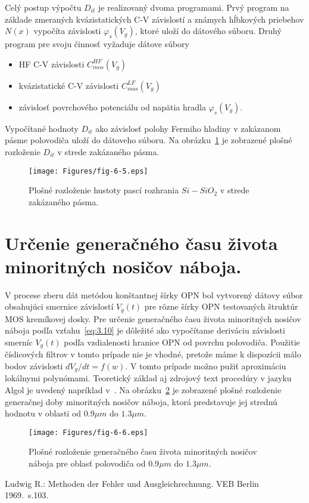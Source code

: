 Celý postup výpočtu $D_{it}$ je realizovaný dvoma programami. Prvý
program na základe zmeraných kvázistatických C-V závislostí a známych
hĺbkových priebehov $N(x)$ vypočíta závislosti $\varphi_{s}(V_{g})$,
ktoré uloží do dátového súboru. Druhý program pre svoju činnosť
vyžaduje dátove súbory

\begin{itemize}
\item HF C-V závislosti $C_{mos}^{HF}(V_{g})$
\item kvázistatické C-V závislosti $C_{mos}^{LF}(V_{g})$
\item závislosť povrchového potenciálu od napätia hradla $\varphi_{s}(V_{g})$.
\end{itemize}

Vypočítané hodnoty $D_{it}$ ako závislosť polohy Fermiho hladiny v
zakázanom pásme polovodiča uloží do dátoveho súboru. Na
obrázku~\ref{fig:6.5} je zobrazené plošné rozloženie $D_{it}$ v strede
zakázaného pásma.

\begin{figure}[h!]\centering
  \texttt{[image: Figures/fig-6-5.eps]}
  \caption[Plošné rozloženie hustoty pascí rozhrania $Si-SiO_{2}$ v
    strede zakázaného pásma]{Plošné rozloženie hustoty pascí rozhrania
    $Si-SiO_{2}$ v strede zakázaného pásma.}\label{fig:6.5}
\end{figure}

\section{Určenie generačného času života minoritných nosičov náboja.}\label{sec:6.4}

V procese zberu dát metódou konštantnej šírky OPN bol vytvorený dátovy
súbor obsahujúci smernice závislostí $V_{g}(t)$ pre rôzne šírky OPN
testovaných štruktúr MOS kremíkovej dosky. Pre určenie generačného
času života minoritných nosičov náboja podľa vzťahu~\ref{eq:3.10} je
dôležité ako vypočítame deriváciu závislosti smerníc $V_{g}(t)$ podľa
vzdialenosti hranice OPN od povrchu polovodiča. Použitie číslicových
filtrov v tomto prípade nie je vhodné, pretože máme k dispozícii málo
bodov závislosti $dV_{g}/dt = f(w)$. V tomto prípade možno pužiť
aproximáciu lokálnymi polynómami. Teoretický základ aj zdrojový text
procedúry v jazyku Algol je uvedený napríklad v~\cite{6.1}. Na
obrázku~\ref{fig:6.6} je zobrazené plošné rozloženie generačnej doby
minoritných nosičov náboja, ktorá predstavuje jej strednú hodnotu v
oblasti od $0.9\mu m$ do $1.3\mu m$.

\begin{figure}[h!]\centering
  \texttt{[image: Figures/fig-6-6.eps]}
  \caption[Plošné rozloženie generačného času života minoritných
    nosičov náboja]{Plošné rozloženie generačného času života
    minoritných nosičov náboja pre oblasť polovodiča od $0.9 \mu m$ do
    $1.3 \mu m$.}\label{fig:6.6}
\end{figure}

\begin{thebibliography}{}
  Ludwig R.: Methoden der Fehler und Ausgleichrechnung. VEB Berlin 1969.\ s.103.
\end{thebibliography}
